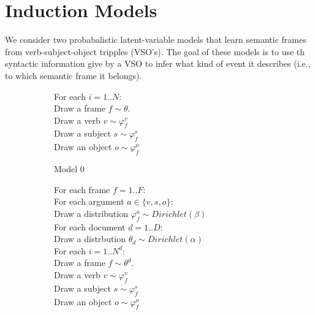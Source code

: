 \documentclass{article} %
\renewcommand\phi\varphi
\begin{document}
\section{Induction Models}
\label{models}
We consider two probabalistic latent-variable models that learn semantic frames
from verb-subject-object tripples (VSO's).
The goal of these models is to use th syntactic information give by a VSO to
infer what kind of event it describes (i.e., to which semantic frame it belongs).


\begin{figure}[h]

  \begin{subfigure}[b]{0.45\textwidth}

    \begin{snugshade}
    \scriptsize
    For each $i = 1..N$:\\
    \hspace*{15pt} Draw a frame $f \sim \theta$.\\
    \hspace*{15pt} Draw a verb $v \sim \phi_f^v$\\
    \hspace*{15pt} Draw a subject $s \sim \phi_f^s$\\
    \hspace*{15pt} Draw an object $o \sim \phi_f^o$
    \end{snugshade}

    

    \caption{Model 0}
    \label{gen0}

  \end{subfigure}
  \hfill
  \begin{subfigure}[b]{0.45\textwidth}

    \begin{snugshade}
    \scriptsize
    For each frame $f=1..F$:\\
    \hspace*{15pt} For each argument $a\in\{v,s,o\}$:\\
    \hspace*{30pt} Draw a distribution $\phi_f^a\sim Dirichlet(\beta)$\\
    For each document $d=1..D$:\\
    \hspace*{15pt} Draw a distrbution $\theta_d \sim Dirichlet(\alpha)$\\
    \hspace*{30pt} For each $i = 1..N^d$:\\
    \hspace*{30pt} Draw a frame $f \sim \theta^d$.\\
    \hspace*{30pt} Draw a verb $v \sim \phi_f^v$\\
    \hspace*{30pt} Draw a subject $s \sim \phi_f^s$\\
    \hspace*{30pt} Draw an object $o \sim \phi_f^o$
    \end{snugshade}


\end{subfigure}
\end{figure}
\end{document}
